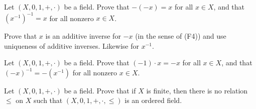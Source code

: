 \begin{exercise}
\label{exInverseIsInvolution}
Let $(X, 0, 1, +, {\cdot})$ be a field. Prove that $-(-x)=x$ for all $x \in X$, and that $(x^{-1})^{-1} = x$ for all nonzero $x \in X$.
\begin{backhint}
Prove that $x$ is an additive inverse for $-x$ (in the sense of (F4)) and use uniqueness of additive inverses. Likewise for $x^{-1}$.
\end{backhint}
\end{exercise}


\begin{exercise}
\label{exMinusOneSquaredIsOne}
Let $(X,0,1,+,{\cdot})$ be a field. Prove that $(-1) \cdot x = -x$ for all $x \in X$, and that $(-x)^{-1} = -(x^{-1})$ for all nonzero $x \in X$.
\end{exercise}



\begin{exercise}
Let $(X,0,1,+,{\cdot})$ be a field. Prove that if $X$ is finite, then there is no relation $\le$ on $X$ such that $(X,0,1,+,{\cdot},{\le})$ is an ordered field.
\end{exercise}
